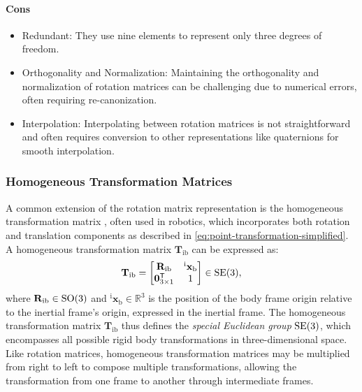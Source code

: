 \paragraph{Cons}
\begin{itemize}
    \item Redundant: They use nine elements to represent only three degrees of freedom.
    \item Orthogonality and Normalization: Maintaining the orthogonality and normalization of rotation matrices can be challenging due to numerical errors, often requiring re-canonization.
    \item Interpolation: Interpolating between rotation matrices is not straightforward and often requires conversion to other representations like quaternions for smooth interpolation.
\end{itemize}

\subsubsection{Homogeneous Transformation Matrices}
\label{par:homogeneous-transformation}
A common extension of the rotation matrix representation is the homogeneous transformation matrix \cite{Diebel06}, often used in robotics, 
which incorporates both rotation and translation components as described in \cref{eq:point-transformation-simplified}. 
A homogeneous transformation matrix \(\mathbf{T}_{\text{ib}}\) can be expressed as:
\begin{equation}
    \mathbf{T}_{\text{ib}} = 
    \begin{bmatrix}
        \mathbf{R}_{\text{ib}} & {}^{\text{i}}\mathbf{x}_{\text{b}} \\
        \mathbf{0}^\mathsf{T}_{3 \times 1} & 1
    \end{bmatrix} \in \mathrm{SE}(3),
    \label{eq:homogeneous-transformation-matrix}
\end{equation}
where \(\mathbf{R}_{\text{ib}} \in \mathrm{SO}(3)\) and \({}^{\text{i}}\mathbf{x}_{\text{b}} \in \mathbb{R}^3\) is the position of the body frame origin relative to the inertial frame's origin, expressed in the inertial frame.
The homogeneous transformation matrix \(\mathbf{T}_{\text{ib}}\) thus defines the \emph{special Euclidean group} \(\mathrm{SE}(3)\), which encompasses all possible rigid body transformations in three-dimensional space.
Like rotation matrices, homogeneous transformation matrices may be multiplied from right to left to compose multiple transformations, allowing the transformation from one frame to another through intermediate frames.

